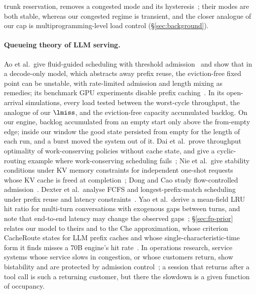 trunk reservation, removes a congested mode and its hysteresis~\citep{gibbens1990bistability}; their modes are both stable, whereas our congested regime is transient, and the closer analogue of our cap is multiprogramming-level load control (\S\ref{sec:background}).

\paragraph{Queueing theory of LLM serving.} Ao et al.\ give fluid-guided scheduling with threshold admission~\citep{ao2025wait} and show that in a decode-only model, which abstracts away prefix reuse, the eviction-free fixed point can be unstable, with rate-limited admission and length mixing as remedies; its benchmark GPU experiments disable prefix caching~\citep{ao2026service}. In its open-arrival simulations, every load tested between the worst-cycle throughput, the analogue of our $\lmiss$, and the eviction-free capacity accumulated backlog. On our engine, backlog accumulated from an empty start only above the from-empty edge; inside our window the good state persisted from empty for the length of each run, and a burst moved the system out of it. Dai et al.\ prove throughput optimality of work-conserving policies without cache state, and give a cyclic-routing example where work-conserving scheduling fails~\citep{dai2025throughput}; Nie et al.\ give stability conditions under KV memory constraints for independent one-shot requests whose KV cache is freed at completion~\citep{nie2026queueing}; Dong and Cao study flow-controlled admission~\citep{dong2026flow}. Dexter et al.\ analyse FCFS and longest-prefix-match scheduling under prefix reuse and latency constraints~\citep{dexter2025prefix}. Yao et al.\ derive a mean-field LRU hit ratio for multi-turn conversations with exogenous gaps between turns, and note that end-to-end latency may change the observed gaps~\citep{yao2026multiturn}; \S\ref{sec:fp-prior} relates our model to theirs and to the Che approximation, whose criterion CacheRoute states for LLM prefix caches and whose single-characteristic-time form it finds misses a 70B engine's hit rate~\citep{cheng2026cacheroute}. In operations research, service systems whose service slows in congestion, or whose customers return, show bistability and are protected by admission control~\citep{chan2014speedup,dong2015slowdowns,ingolfsson2020fluid}; a session that returns after a tool call is such a returning customer, but there the slowdown is a given function of occupancy.

